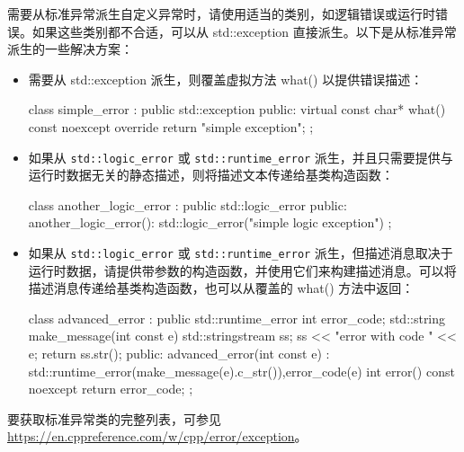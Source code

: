 需要从标准异常派生自定义异常时，请使用适当的类别，如逻辑错误或运行时错误。如果这些类别都不合适，可以从 std::exception 直接派生。以下是从标准异常派生的一些解决方案：

\begin{itemize}
\item
需要从 std::exception 派生，则覆盖虚拟方法 what() 以提供错误描述：

\begin{cpp}
class simple_error : public std::exception
{
    public:
    virtual const char* what() const noexcept override
    {
        return "simple exception";
    }
};
\end{cpp}

\item
如果从 \verb|std::logic_error| 或 \verb|std::runtime_error| 派生，并且只需要提供与运行时数据无关的静态描述，则将描述文本传递给基类构造函数：

\begin{cpp}
class another_logic_error : public std::logic_error
{
public:
    another_logic_error():
    std::logic_error("simple logic exception")
    {}
};
\end{cpp}

\item
如果从 \verb|std::logic_error| 或 \verb|std::runtime_error| 派生，但描述消息取决于运行时数据，请提供带参数的构造函数，并使用它们来构建描述消息。可以将描述消息传递给基类构造函数，也可以从覆盖的 what() 方法中返回：

\begin{cpp}
class advanced_error : public std::runtime_error
{
    int error_code;
    std::string make_message(int const e)
    {
        std::stringstream ss;
        ss << "error with code " << e;
        return ss.str();
    }
public:
    advanced_error(int const e) :
    std::runtime_error(make_message(e).c_str()),error_code(e)
    {
    }
    int error() const noexcept
    {
        return error_code;
    }
};
\end{cpp}
\end{itemize}

要获取标准异常类的完整列表，可参见 \url{https://en.cppreference.com/w/cpp/error/exception}。

